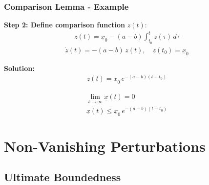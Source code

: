 \documentclass[student, noshadow, lsr, english, aspectratio=169, t]{ITR_LSR_slides}
\begin{document}
\begin{frame}
    \frametitle{Comparison Lemma - Example}

    \textbf{Step 2: Define comparison function } $z(t)$:
    \begin{align*}
        z(t) = \underline{x}_0 - (a - b) \int_{t_0}^{t} z(\tau)\, d\tau
    \end{align*}
    \begin{align*}
        \dot{z}(t) = -(a - b)\,z(t), \quad z(t_0) = \underline{x}_0
    \end{align*}

    \textbf{Solution:}
    \begin{align*}
        z(t) = \underline{x}_0\, e^{-(a - b)(t - t_0)}
    \end{align*}

    \vspace{-0.3cm}
    \begin{tcolorbox}[title=Conclusion: Exponential Stability of the Perturbed System]
        \vspace{-0.4cm}
        \begin{align*}
            \lim_{t \to \infty} \underline{x}(t) = 0 \\[0.3cm]
            \underline{x}(t) \leq \underline{x}_0\, e^{-(a - b)(t - t_0)}
        \end{align*}
    \end{tcolorbox}
\end{frame}



\section{Non-Vanishing Perturbations}
\subsection*{Ultimate Boundedness} %
\end{document}
